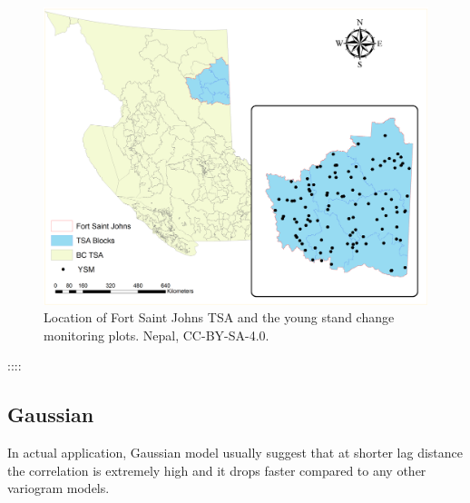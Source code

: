 \documentclass[
]{book}
\begin{document}
\begin{figure}
\includegraphics[width=45.83in]{images/10-FSJ-plot} \caption{Location of Fort Saint Johns TSA and the young stand change monitoring plots. Nepal, CC-BY-SA-4.0.}\label{fig:10-FSJ-plot}
\end{figure}

::::

\hypertarget{gaussian}{%
\subsection{Gaussian}\label{gaussian}}

In actual application, Gaussian model usually suggest that at shorter lag distance the correlation is extremely high and it drops faster compared to any other variogram models.
\end{document}
